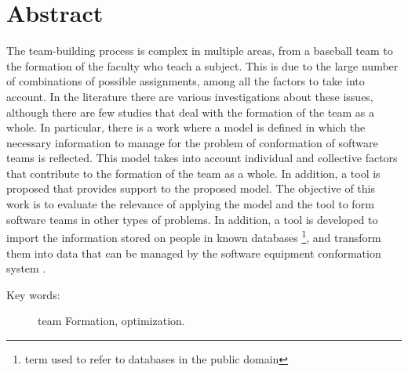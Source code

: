 
\section*{Abstract} 

The team-building process is complex in multiple areas, from a baseball team to the formation of the faculty who teach a subject. This is due to the large number of combinations of possible assignments, among all the factors to take into account. In the literature there are various investigations about these issues, although there are few studies that deal with the formation of the team as a whole. In particular, there is a work where a model is defined in which the necessary information to manage for the problem of conformation of software teams is reflected. This model takes into account individual and collective factors that contribute to the formation of the team as a whole. In addition, a tool is proposed that provides support to the proposed model. The objective of this work is to evaluate the relevance of applying the model and the tool to form software teams in other types of problems. In addition, a tool is developed to import the information stored on people in known databases \footnote {term used to refer to databases in the public domain}, and transform them into data that can be managed by the software equipment conformation system .

\begin{description}
	\item[Key words:]{team Formation, optimization.}
\end{description}